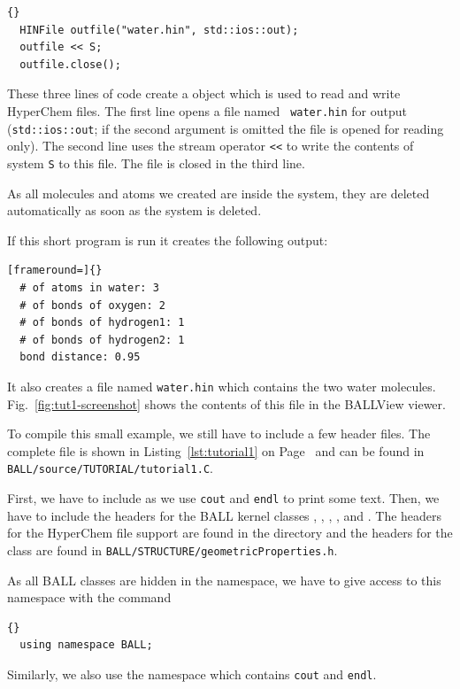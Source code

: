\begin{lstlisting}{}
  HINFile outfile("water.hin", std::ios::out);
  outfile << S;
  outfile.close();
\end{lstlisting}

\noindent
These three lines of code create a  object which is used to
read and write HyperChem files. The first line opens a file named {\tt
water.hin} for output ({\tt std::ios::out}; if the second argument is omitted the
file is opened for reading only). The second line uses the stream operator 
{\tt <<}  to write the contents of system {\tt S} to 
this file. The file is closed in the third line.

\noindent 
As all molecules and atoms we created are inside the system, they are deleted
automatically as soon as the system is deleted.

If this short program is run it creates the following output:

\begin{lstlisting}[frameround=]{}
  # of atoms in water: 3
  # of bonds of oxygen: 2
  # of bonds of hydrogen1: 1
  # of bonds of hydrogen2: 1
  bond distance: 0.95
\end{lstlisting}

\noindent
It also creates a file named {\tt water.hin} which contains the two water
molecules. Fig.~\ref{fig:tut1-screenshot} shows the contents of this file
in the BALLView viewer.

To compile this small example, we still have to include a few header files.
The complete file is shown in Listing~\ref{lst:tutorial1} on
Page~\pageref{lst:tutorial1} and can be found in \mbox{{\tt
BALL/source/TUTORIAL/tutorial1.C}}.

First, we have to include  as we use {\tt cout} and {\tt endl}
to print some text. Then, we have to include the headers for the BALL kernel
classes , , , , and
. The headers for the HyperChem file support are found in the
directory  and the headers for the
 class are found in
{\tt BALL/STRUCTURE/geometricProperties.h}.

As all BALL classes are hidden in the  namespace, we have to
give access to this namespace with the command 
\begin{lstlisting}{}
  using namespace BALL;
\end{lstlisting}
Similarly, we also use the namespace  which contains {\tt cout}
and {\tt endl}.

